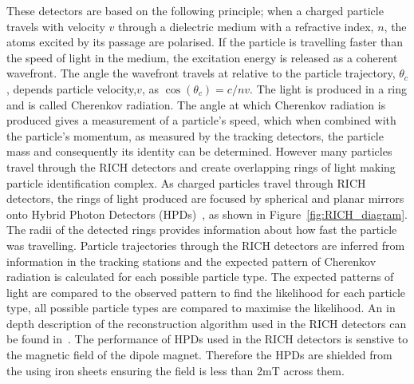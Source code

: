 These detectors are based on the following principle; when a charged particle travels with velocity $v$ through a dielectric medium with a refractive index, $n$, the atoms excited by its passage are polarised. If the particle is travelling faster than the speed of light in the medium, the excitation energy is released as a coherent wavefront. The angle the wavefront travels at relative to the particle trajectory, $\theta_{c}$, depends particle velocity,$v$, as $\cos(\theta_{c}) = c/nv$. The light is produced in a ring and is called Cherenkov radiation. %
The angle at which Cherenkov radiation is produced gives a measurement of a particle’s speed, which when combined with the particle’s momentum, as measured by the tracking detectors, the particle mass and consequently its identity can be determined. However many particles travel through the RICH detectors and create overlapping rings of light making particle identification complex. 
As charged particles travel through RICH detectors, the rings of light produced are focused by spherical and planar mirrors onto Hybrid Photon Detectors (HPDs)~\cite{Alemi:1999np}, as shown in Figure~\ref{fig:RICH_diagram}. The radii of the detected rings provides information about how fast the particle was travelling.
Particle trajectories through the RICH detectors are inferred from information in the tracking stations and the expected pattern of Cherenkov radiation is calculated for each possible particle type. The expected patterns of light are compared to the observed pattern to find the likelihood for each particle type, all possible particle types are compared to maximise the likelihood. An in depth description of the reconstruction algorithm used in the RICH detectors can be found in~\cite{Forty:684714}. 
The performance of HPDs used in the RICH detectors is senstive to the magnetic field of the dipole magnet.
Therefore the HPDs are shielded from the using iron sheets ensuring the field is less than 2mT across them. %

